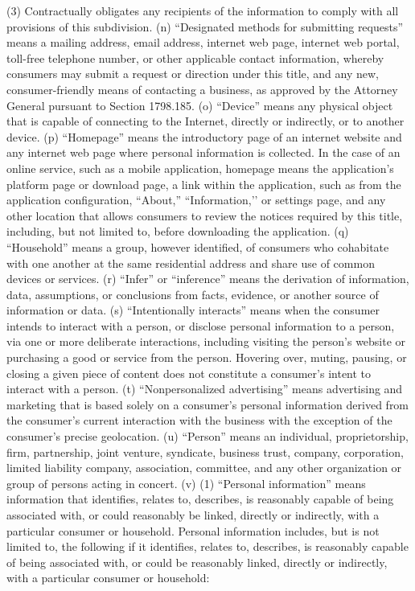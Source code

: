 (3) Contractually obligates any recipients of the information to comply with all provisions of this subdivision.
(n) “Designated methods for submitting requests” means a mailing address, email address, internet web page, internet web portal, toll-free telephone number, or other applicable contact information, whereby consumers may submit a request or direction under this title, and any new, consumer-friendly means of contacting a business, as approved by the Attorney General pursuant to Section 1798.185.
(o) “Device” means any physical object that is capable of connecting to the Internet, directly or indirectly, or to another device.
(p) “Homepage” means the introductory page of an internet website and any internet web page where personal information is collected. In the case of an online service, such as a mobile application, homepage means the application’s platform page or download page, a link within the application, such as from the application configuration, “About,” “Information,’’ or settings page, and any other location that allows consumers to review the notices required by this title, including, but not limited to, before downloading the application.
(q) “Household” means a group, however identified, of consumers who cohabitate with one another at the same residential address and share use of common devices or services.
(r) “Infer” or “inference” means the derivation of information, data, assumptions, or conclusions from facts, evidence, or another source of information or data.
(s) “Intentionally interacts” means when the consumer intends to interact with a person, or disclose personal information to a person, via one or more deliberate interactions, including visiting the person’s website or purchasing a good or service from the person. Hovering over, muting, pausing, or closing a given piece of content does not constitute a consumer’s intent to interact with a person.
(t) “Nonpersonalized advertising” means advertising and marketing that is based solely on a consumer’s personal information derived from the consumer’s current interaction with the business with the exception of the consumer’s precise geolocation.
(u) “Person” means an individual, proprietorship, firm, partnership, joint venture, syndicate, business trust, company, corporation, limited liability company, association, committee, and any other organization or group of persons acting in concert.
(v) (1) “Personal information” means information that identifies, relates to, describes, is reasonably capable of being associated with, or could reasonably be linked, directly or indirectly, with a particular consumer or household. Personal information includes, but is not limited to, the following if it identifies, relates to, describes, is reasonably capable of being associated with, or could be reasonably linked, directly or indirectly, with a particular consumer or household:
